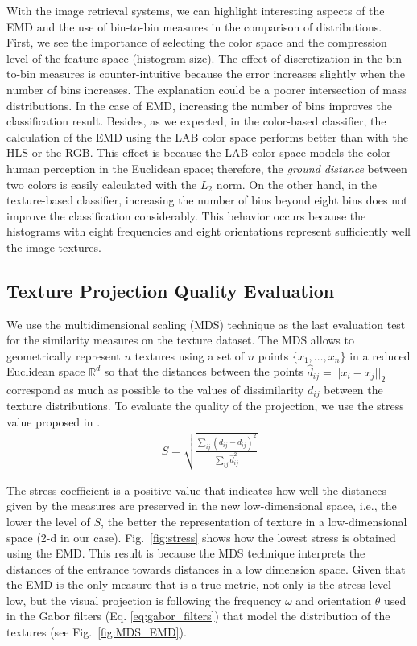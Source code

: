 With the image retrieval systems, we can highlight interesting aspects of the EMD and the use of bin-to-bin measures in the comparison of distributions. First, we see the importance of selecting the color space and the compression level of the feature space (histogram size). The effect of discretization in the bin-to-bin measures is counter-intuitive because the error increases slightly when the number of bins increases. The explanation could be a poorer intersection of mass distributions. In the case of EMD, increasing the number of bins improves the classification result. Besides, as we expected, in the color-based classifier, the calculation of the EMD using the LAB color space performs better than with the HLS or the RGB. This effect is because the LAB color space models the color human perception in the Euclidean space; therefore, the \textit{ground distance} between two colors is easily calculated with the $L_2$ norm. On the other hand, in the texture-based classifier, increasing the number of bins beyond eight bins does not improve the classification considerably. This behavior occurs because the histograms with eight frequencies and eight orientations represent sufficiently well the image textures.

\subsection{Texture Projection Quality Evaluation} \label{subsec:mds}

We use the multidimensional scaling (MDS) technique \citep{Kruskal:Psycho:1964} as the last evaluation test for the similarity measures on the texture dataset. The MDS allows to geometrically represent $n$ textures using a set of $n$ points $\{x_1, \ldots, x_n\}$ in a reduced Euclidean space $\mathbb{R}^{d}$ so that the distances between the points $\hat{d}_{ij} = ||x_i-x_j||_2$ correspond as much as possible to the values of dissimilarity $d_{ij}$ between the texture distributions. To evaluate the quality of the projection, we use the stress value proposed in \citep{Kruskal:Psycho:1964}.
\begin{eqnarray}
S= \sqrt{\frac{\sum_{ij}(\hat{d}_{ij}-d_{ij})^2}{\sum_{ij}\hat{d}_{ij}^2}}
\label{eq:stress}
\end{eqnarray}

The stress coefficient is a positive value that indicates how well the distances given by the measures are preserved in the new low-dimensional space, i.e., the lower the level of $S$, the better the representation of texture in a low-dimensional space (2-d in our case). Fig.\ \ref{fig:stress} shows how the lowest stress is obtained using the EMD. This result is because the MDS technique interprets the distances of the entrance towards distances in a low dimension space. Given that the EMD is the only measure that is a true metric, not only is the stress level low, but the visual projection is following the frequency $\omega$ and orientation $\theta$ used in the Gabor filters (Eq. \eqref{eq:gabor_filters}) that model the distribution of the textures (see Fig.\ \ref{fig:MDS_EMD}). %

